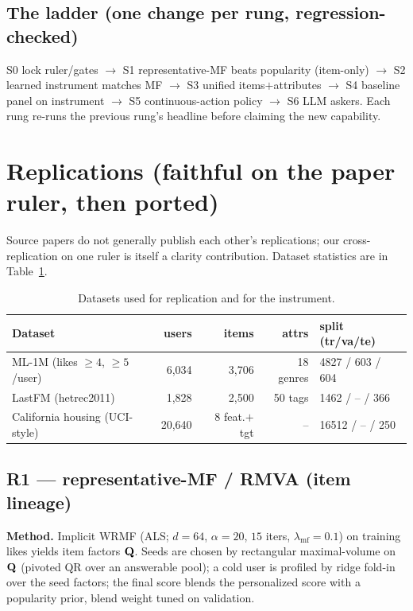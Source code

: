 \subsection{The ladder (one change per rung, regression-checked)}
S0 lock ruler/gates $\to$ S1 representative-MF beats popularity (item-only) $\to$ S2 learned instrument matches MF
$\to$ S3 unified items$+$attributes $\to$ S4 baseline panel on instrument $\to$ S5 continuous-action policy $\to$
S6 LLM askers. Each rung re-runs the previous rung's headline before claiming the new capability.

\section{Replications (faithful on the paper ruler, then ported)}\label{sec:repl}
Source papers do not generally publish each other's replications; our cross-replication on one ruler is itself a
clarity contribution. Dataset statistics are in Table~\ref{tab:data}.

\begin{table}[h]\centering\small
\begin{tabular}{lrrrl}
\toprule
Dataset & users & items & attrs & split (tr/va/te)\\
\midrule
ML-1M (likes $\ge4$, $\ge5$/user) & 6{,}034 & 3{,}706 & 18 genres & 4827 / 603 / 604\\
LastFM (hetrec2011) & 1{,}828 & 2{,}500 & 50 tags & 1462 / -- / 366\\
California housing (UCI-style) & 20{,}640 & 8 feat.$+$tgt & -- & 16512 / -- / 250\\
\bottomrule
\end{tabular}
\caption{Datasets used for replication and for the instrument.}
\label{tab:data}
\end{table}

\subsection{R1 --- representative-MF / RMVA (item lineage)}
\textbf{Method.} Implicit WRMF (ALS; $d{=}64$, $\alpha{=}20$, $15$ iters, $\lambda_{\mathrm{mf}}{=}0.1$) on
training likes yields item factors $\mathbf{Q}$. Seeds are chosen by rectangular maximal-volume on $\mathbf{Q}$ (pivoted QR over
an answerable pool); a cold user is profiled by ridge fold-in over the seed factors; the final score blends the
personalized score with a popularity prior, blend weight tuned on validation.

